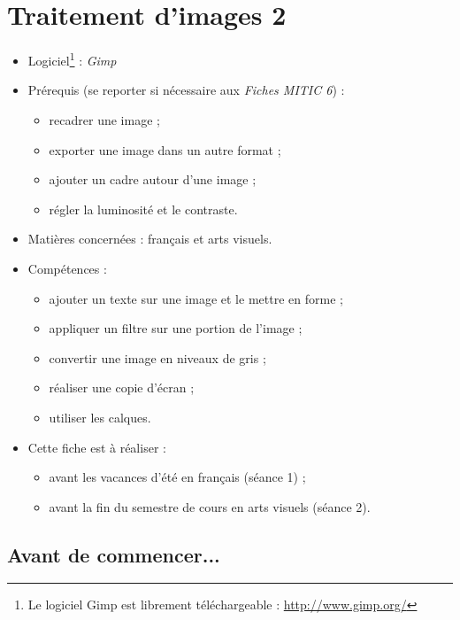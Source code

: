 \chapter{Traitement d'images 2}  

{\footnotesize
\begin{itemize}
\item Logiciel\footnote{Le logiciel Gimp est librement téléchargeable : \url{http://www.gimp.org/}} : \emph{Gimp}
\item Prérequis (se reporter si nécessaire aux \emph{Fiches MITIC 6}) :
        \begin{itemize}
        \item recadrer une image ;
        \item exporter une image dans un autre format ;
        \item ajouter un cadre autour d'une image ;
        \item régler la luminosité et le contraste.
        \end{itemize}
\item Matières concernées : français et arts visuels.
\item Compétences : 
        \begin{itemize}
        \item ajouter un texte sur une image et le mettre en forme ;
        \item appliquer un filtre sur une portion de l'image ;
        \item convertir une image en niveaux de gris ;
        \item réaliser une copie d'écran ;
        \item utiliser les calques.
        \end{itemize}
\item Cette fiche est à réaliser :
        \begin{itemize}
        \item avant les vacances d'été en français (séance 1) ;
        \item avant la fin du semestre de cours en arts visuels (séance 2).
        \end{itemize}
\end{itemize}
} %



\section*{Avant de commencer...}

